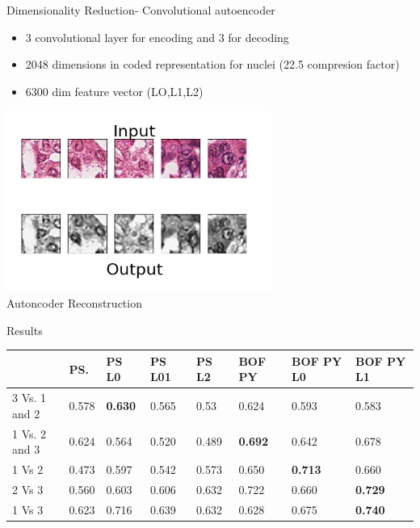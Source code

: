 \documentclass[usenames,dvipsnames]{beamer}
\begin{document}
\begin{frame}{Dimensionality Reduction- Convolutional autoencoder}
\begin{itemize}
    \item 3 convolutional layer for encoding and 3 for decoding
    \item 2048 dimensions in coded representation for nuclei (22.5 compresion factor)
    \item 6300 dim feature vector ({LO,L1,L2})
\end{itemize}
    \centering
    \includegraphics[width=0.65\textwidth]{imagenes_cnn/autoencoderresponse.png}
    \\Autoncoder Reconstruction
\end{frame}




\begin{frame}{Results}

\begin{table}[l]
\begin{tabular}{|m{1.2cm}|m{1cm}|m{1cm}|m{1cm}|m{1cm}||m{1cm}|m{1cm}|m{1cm}|}
\hline
              & PS.  & PS L0   & PS L01 & PS L2 & BOF PY          & BOF PY L0       & BOF PY L1\\ \hline
3 Vs. 1 and 2 & 0.578     & \textbf{0.630} & 0.565        & 0.53         & 0.624          & 0.593           & 0.583\\ \hline
1 Vs. 2 and 3 & 0.624    & 0.564          & 0.520         & 0.489        & \textbf{0.692} & 0.642           & 0.678\\ \hline
1 Vs 2        & 0.473     & 0.597          & 0.542         & 0.573        & 0.650           & \textbf{0.713} & 0.660\\ \hline
2 Vs 3        & 0.560     & 0.603          & 0.606         & 0.632        & 0.722          & 0.660           & \textbf{0.729}\\ \hline
1 Vs 3        & 0.623     & 0.716          & 0.639         & 0.632       & 0.628          & 0.675         & \textbf{0.740} \\ \hline
\end{tabular}
\end{table}
    
\end{frame}
\end{document}
